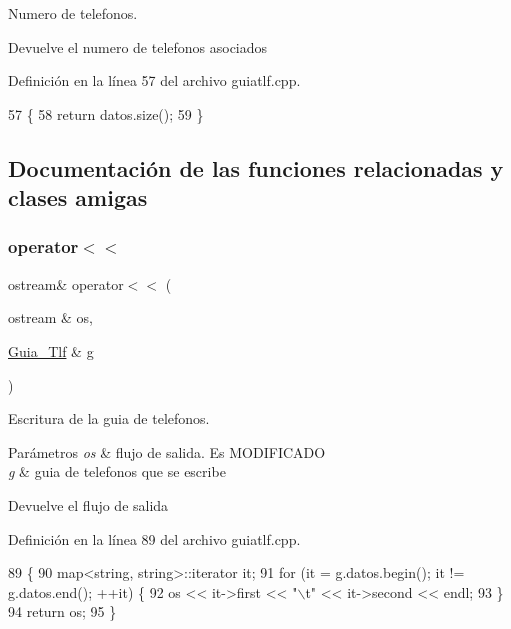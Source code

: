 Numero de telefonos. 

\begin{DoxyReturn}{Devuelve}
el numero de telefonos asociados 
\end{DoxyReturn}


Definición en la línea 57 del archivo guiatlf.\+cpp.


\begin{DoxyCode}
57                         \{
58     \textcolor{keywordflow}{return} datos.size();
59 \}
\end{DoxyCode}


\subsection{Documentación de las funciones relacionadas y clases amigas}
\mbox{\label{classGuia__Tlf_a73eb02557f3118999710c66aa9ecf309}} 
\subsubsection{\texorpdfstring{operator$<$$<$}{operator<<}}
{\footnotesize\ttfamily ostream\& operator$<$$<$ (\begin{DoxyParamCaption}\item[{ostream \&}]{os,  }\item[{\hyperlink{classGuia__Tlf}{Guia\+\_\+\+Tlf} \&}]{g }\end{DoxyParamCaption})\hspace{0.3cm}{\ttfamily [friend]}}



Escritura de la guia de telefonos. 


\begin{DoxyParams}{Parámetros}
{\em os} & flujo de salida. Es M\+O\+D\+I\+F\+I\+C\+A\+DO \\
\hline
{\em g} & guia de telefonos que se escribe \\
\hline
\end{DoxyParams}
\begin{DoxyReturn}{Devuelve}
el flujo de salida 
\end{DoxyReturn}


Definición en la línea 89 del archivo guiatlf.\+cpp.


\begin{DoxyCode}
89                                                  \{
90         map<string, string>::iterator it;
91         \textcolor{keywordflow}{for} (it = g.datos.begin(); it != g.datos.end(); ++it) \{
92             os << it->first << \textcolor{stringliteral}{"\(\backslash\)t"} << it->second << endl;
93         \}
94         \textcolor{keywordflow}{return} os;
95     \}
\end{DoxyCode}
\mbox{\label{classGuia__Tlf_ac15a5b0c2eb7d5b1843f11beb492495e}} 
